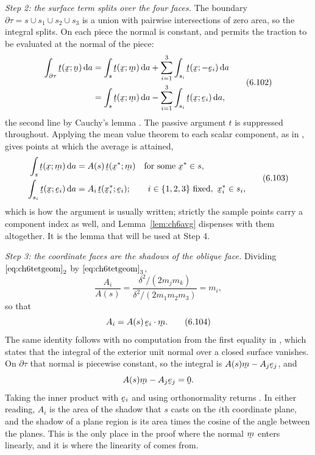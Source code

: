 \emph{Step 2: the surface term splits over the four faces.} The boundary
$\partial\tau=s\cup s_{1}\cup s_{2}\cup s_{3}$ is a union with pairwise
intersections of zero area, so the integral splits. On each piece the
normal is constant, and  permits the traction to be evaluated
at the normal of the piece:
\begin{equation}
\begin{aligned}
   \int_{\partial\tau}\bt(\bx;\bn)\,\dl a
   &=\int_{s}\bt(\bx;\bm)\,\dl a
    +\sum_{i=1}^{3}\int_{s_{i}}\bt(\bx;-\be_{i})\,\dl a\\
   &=\int_{s}\bt(\bx;\bm)\,\dl a
    -\sum_{i=1}^{3}\int_{s_{i}}\bt(\bx;\be_{i})\,\dl a ,
\end{aligned}
   \tag{6.102}\label{eq:6.102}
\end{equation}
the second line by Cauchy's lemma . The passive argument $t$
is suppressed throughout. Applying the mean value theorem to each
scalar component, as in , gives points at which the average is
attained,
\begin{equation}
\begin{aligned}
   \int_{s}\bt(\bx;\bm)\,\dl a&=A(s)\,\bt(\bx^{*};\bm)
     \quad\text{for some }\bx^{*}\in s,\\
   \int_{s_{i}}\bt(\bx;\be_{i})\,\dl a
     &=A_{i}\,\bt(\bx^{*}_{i};\be_{i});\qquad
     i\in\{1,2,3\}\text{ fixed},\ \bx^{*}_{i}\in s_{i},
\end{aligned}
   \tag{6.103}\label{eq:6.103}
\end{equation}
which is how the argument is usually written; strictly the sample points
carry a component index as well, and Lemma~\ref{lem:ch6avg} dispenses
with them altogether. It is the lemma that will be used at Step 4.

\emph{Step 3: the coordinate faces are the shadows of the oblique face.}
Dividing $\eqref{eq:ch6tetgeom}_{2}$ by $\eqref{eq:ch6tetgeom}_{3}$,
\[
   \frac{A_{i}}{A(s)}
   =\frac{\delta^{2}/(2m_{j}m_{k})}{\delta^{2}/(2m_{1}m_{2}m_{3})}
   =m_{i} ,
\]
so that
\begin{equation}
   A_{i}=A(s)\,\ip{\be_{i}}\bm .
   \tag{6.104}\label{eq:6.104}
\end{equation}
The same identity follows with no computation from the first equality in
, which states that the integral of the exterior unit normal
over a closed surface vanishes. On $\partial\tau$ that normal is
piecewise constant, so the integral is $A(s)\bm-A_{j}\be_{j}$, and
\[
   A(s)\bm-A_{j}\be_{j}=\bze .
\]
Taking the inner product with $\be_{i}$ and using orthonormality returns
. In either reading, $A_{i}$ is the area of the shadow that
$s$ casts on the $i$th coordinate plane, and the shadow of a plane
region is its area times the cosine of the angle between the planes.
This is the only place in the proof where the normal $\bm$ enters
linearly, and it is where the linearity of  comes from.

